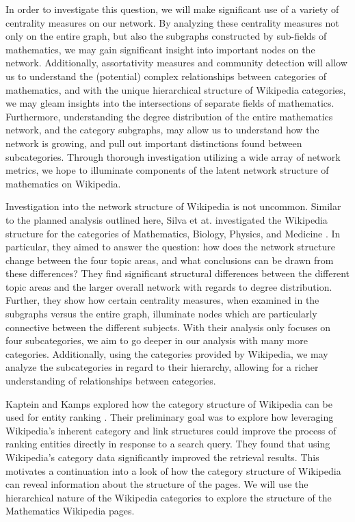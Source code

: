 \documentclass[10pt]{paper}
\begin{document}
In order to investigate this question, we will make significant use of a variety of centrality measures on our network. 
By analyzing these centrality measures not only on the entire graph, but also the subgraphs constructed by sub-fields of mathematics, we may gain significant insight into important nodes on the network. 
Additionally, assortativity measures and community detection will allow us to understand the (potential) complex relationships between categories of mathematics, and with the unique hierarchical structure of Wikipedia categories, we may gleam insights into the intersections of separate fields of mathematics. 
Furthermore, understanding the degree distribution of the entire mathematics network, and the category subgraphs, may allow us to understand how the network is growing, and pull out important distinctions found between subcategories. 
Through thorough investigation utilizing a wide array of network metrics, we hope to illuminate components of the latent network structure of mathematics on Wikipedia. 

Investigation into the network structure of Wikipedia is not uncommon. Similar to the planned analysis outlined here, Silva et at. investigated the Wikipedia structure for the categories of Mathematics, Biology, Physics, and Medicine \cite{silva2011investigating}. 
In particular, they aimed to answer the question: how does the network structure change between the four topic areas, and what conclusions can be drawn from these differences? 
They find significant structural differences between the different topic areas and the larger overall network with regards to degree distribution. Further, they show how certain centrality measures, when examined in the subgraphs versus the entire graph, illuminate nodes which are particularly connective between the different subjects. 
With their analysis only focuses on four subcategories, we aim to go deeper in our analysis with many more categories. Additionally, using the categories provided by Wikipedia, we may analyze the subcategories in regard to their hierarchy, allowing for a richer understanding of relationships between categories.  

Kaptein and Kamps explored how the category structure of Wikipedia can be used for entity ranking \cite{kaptein2013wikipedia}. Their preliminary goal was to explore how leveraging Wikipedia's inherent category and link structures could improve the process of ranking entities directly in response to a search query. They found that using Wikipedia’s category data significantly improved the retrieval results. This motivates a continuation into a look of how the category structure of Wikipedia can reveal information about the structure of the pages. We will use the hierarchical nature of the Wikipedia categories to explore the structure of the Mathematics Wikipedia pages. 
\end{document}
